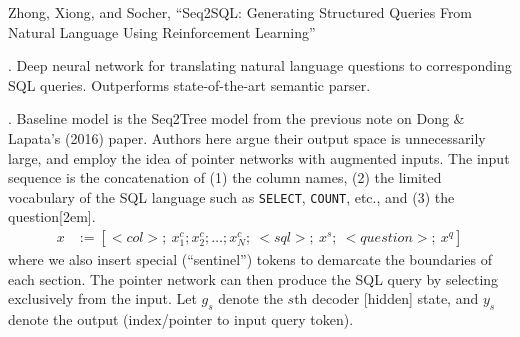 \documentclass[11pt]{article}
\newcommand\myspace[1][]{\vspace{#1\bigskipamount}}
\newcommand\p{\Needspace{10\baselineskip} \noindent}
\begin{document}
\vspace{-1em}
{\footnotesize Zhong, Xiong, and Socher, ``Seq2SQL: Generating Structured Queries From Natural Language Using Reinforcement Learning''}

\p {}. Deep neural network for translating natural language questions to corresponding SQL queries. Outperforms state-of-the-art semantic parser.

\myspace
\p {}. Baseline model is the Seq2Tree model from the previous note on Dong \& Lapata's (2016) paper. Authors here argue their output space is unnecessarily large, and employ the idea of pointer networks with augmented inputs. The input sequence is the concatenation of (1) the column names, (2) the limited vocabulary of the SQL language such as \texttt{SELECT}, \texttt{COUNT}, etc., and (3) the question[2em].
\begin{align}
	x &:= \left[
		<col>;~
		x_1^c; x_2^c; \ldots; x_N^c;~
		<sql>;~
		x^s;~
		<question>;~
		x^q
	\right]
\end{align}
where we also insert special (``sentinel'') tokens to demarcate the boundaries of each section. The pointer network can then produce the SQL query by selecting exclusively from the input. Let $g_s$ denote the $s$th decoder [hidden] state, and $y_s$ denote the output (index/pointer to input query token).
\end{document}
